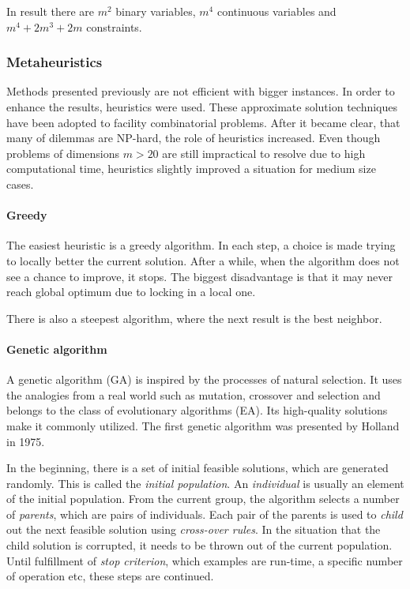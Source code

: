In result there are $m^2$ binary variables, $m^4$ continuous variables and $m^4+2m^3+2m$ constraints.

\subsubsection{Metaheuristics}
Methods presented previously are not efficient with bigger instances.
In order to enhance the results, heuristics were used.
These approximate solution techniques have been adopted to facility combinatorial problems.
After it became clear, that many of dilemmas are NP-hard, the role of heuristics increased.
Even though problems of dimensions $m > 20$ are still impractical to resolve due to high computational time, heuristics slightly improved a situation for medium size cases.

\paragraph{Greedy}

The easiest heuristic is a greedy algorithm.
In each step, a choice is made trying to locally better the current solution.
After a while, when the algorithm does not see a chance to improve, it stops.
The biggest disadvantage is that it may never reach global optimum due to locking in a local one.

There is also a steepest algorithm, where the next result is the best neighbor.


\paragraph{Genetic algorithm}

A genetic algorithm (GA) is inspired by the processes of natural selection.
It uses the analogies from a real world such as mutation, crossover and selection and belongs to the class of evolutionary algorithms (EA).
Its high-quality solutions make it commonly utilized.
The first genetic algorithm was presented by Holland \cite{holland1975adaptation} in 1975.

In the beginning, there is a set of initial feasible solutions, which are generated randomly.
This is called the \textit{initial population}.
An \textit{individual} is usually an element of the initial population.
From the current group, the algorithm selects a number of \textit{parents}, which are pairs of individuals.
Each pair of the parents is used to \textit{child} out the next feasible solution using \textit{cross-over rules}.
In the situation that the child solution is corrupted, it needs to be thrown out of the current population.
Until fulfillment of \textit{stop criterion}, which examples are run-time, a specific number of operation etc, these steps are continued.

